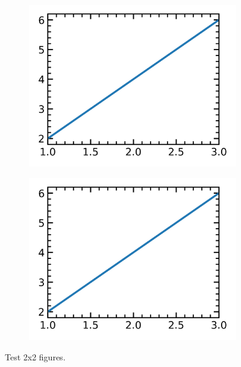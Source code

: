 \documentclass[12pt,a4paper,twoside]{article}
\numberwithin{equation}{section}
\renewcommand{\_}{\textscale{.7}{\textunderscore}}
\begin{document}
\begin{figure}[H]
	\centering
	\begin{subfigure}{0.48\linewidth}
		\includegraphics[width=1.0\linewidth]{2x2.png}
	\end{subfigure}
    \begin{subfigure}{0.48\linewidth}
		\includegraphics[width=1.0\linewidth]{2x2.png}
	\end{subfigure}
    \caption{Test 2x2 figures.}
\end{figure} 
\end{document}

